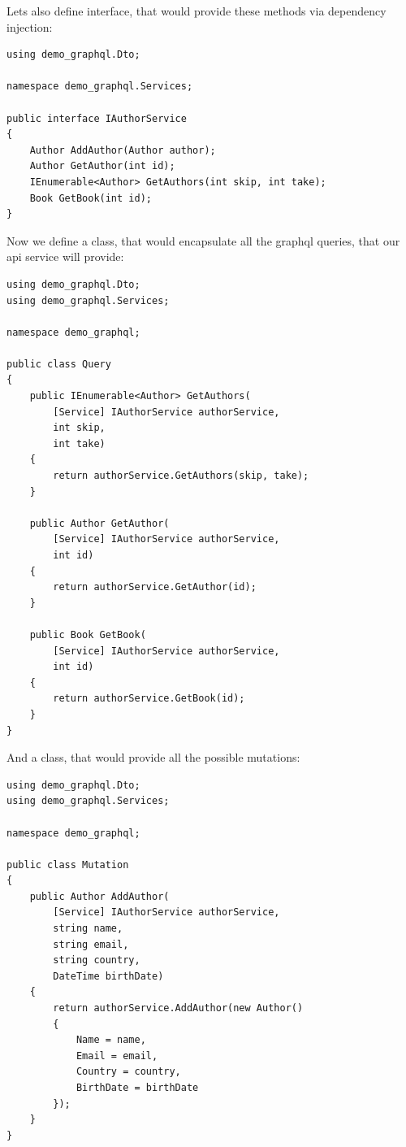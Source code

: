 Lets also define interface, that would provide these methods via dependency injection:


\begin{lstlisting}
using demo_graphql.Dto;

namespace demo_graphql.Services;

public interface IAuthorService
{
    Author AddAuthor(Author author);
    Author GetAuthor(int id);
    IEnumerable<Author> GetAuthors(int skip, int take);
    Book GetBook(int id);
}

\end{lstlisting}

Now we define a class, that would encapsulate all the graphql queries, that our api service will provide:


\begin{lstlisting}
using demo_graphql.Dto;
using demo_graphql.Services;

namespace demo_graphql;

public class Query
{
    public IEnumerable<Author> GetAuthors(
        [Service] IAuthorService authorService,
        int skip,
        int take)
    {
        return authorService.GetAuthors(skip, take);
    }

    public Author GetAuthor(
        [Service] IAuthorService authorService,
        int id)
    {
        return authorService.GetAuthor(id);
    }

    public Book GetBook(
        [Service] IAuthorService authorService,
        int id)
    {
        return authorService.GetBook(id);
    }
}

\end{lstlisting}

And a class, that would provide all the possible mutations:


\begin{lstlisting}
using demo_graphql.Dto;
using demo_graphql.Services;

namespace demo_graphql;

public class Mutation
{
    public Author AddAuthor(
        [Service] IAuthorService authorService,
        string name,
        string email,
        string country,
        DateTime birthDate)
    {
        return authorService.AddAuthor(new Author()
        {
            Name = name,
            Email = email,
            Country = country,
            BirthDate = birthDate
        });
    }
}

\end{lstlisting}


